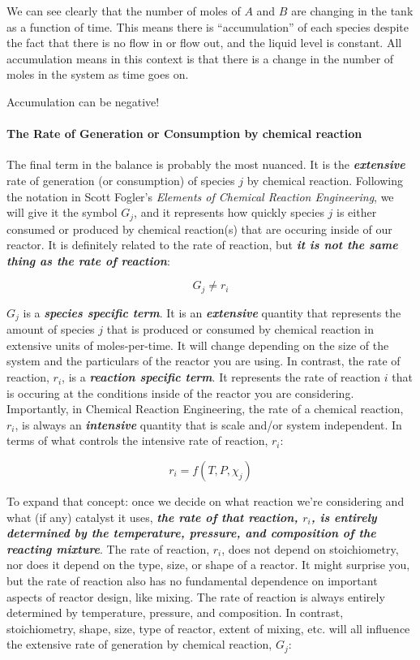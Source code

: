 \documentclass[11pt]{article}
\begin{document}
We can see clearly that the number of moles of \(A\) and \(B\) are
changing in the tank as a function of time. This means there is
``accumulation'' of each species despite the fact that there is no flow
in or flow out, and the liquid level is constant. All accumulation means
in this context is that there is a change in the number of moles in the
system as time goes on.

Accumulation can be negative!

\hypertarget{the-rate-of-generation-or-consumption-by-chemical-reaction}{%
\paragraph{The Rate of Generation or Consumption by chemical
reaction}\label{the-rate-of-generation-or-consumption-by-chemical-reaction}}

The final term in the balance is probably the most nuanced. It is the
\textbf{\emph{extensive}} rate of generation (or consumption) of species
\(j\) by chemical reaction. Following the notation in Scott Fogler's
\emph{Elements of Chemical Reaction Engineering}, we will give it the
symbol \(G_j\), and it represents how quickly species \(j\) is either
consumed or produced by chemical reaction(s) that are occuring inside of
our reactor. It is definitely related to the rate of reaction, but
\textbf{\emph{it is not the same thing as the rate of reaction}}:

\[G_j \neq r_i\]

\(G_j\) is a \textbf{\emph{species specific term}}. It is an
\textbf{\emph{extensive}} quantity that represents the amount of species
\(j\) that is produced or consumed by chemical reaction in extensive
units of moles-per-time. It will change depending on the size of the
system and the particulars of the reactor you are using. In contrast,
the rate of reaction, \(r_i\), is a \textbf{\emph{reaction specific
term}}. It represents the rate of reaction \(i\) that is occuring at the
conditions inside of the reactor you are considering. Importantly, in
Chemical Reaction Engineering, the rate of a chemical reaction, \(r_i\),
is always an \textbf{\emph{intensive}} quantity that is scale and/or
system independent. In terms of what controls the intensive rate of
reaction, \(r_i\):

\[r_i = f(T, P, \chi_j)\]

To expand that concept: once we decide on what reaction we're
considering and what (if any) catalyst it uses, \textbf{\emph{the rate
of that reaction, \(r_i\), is entirely determined by the temperature,
pressure, and composition of the reacting mixture}}. The rate of
reaction, \(r_i\), does not depend on stoichiometry, nor does it depend
on the type, size, or shape of a reactor. It might surprise you, but the
rate of reaction also has no fundamental dependence on important aspects
of reactor design, like mixing. The rate of reaction is always entirely
determined by temperature, pressure, and composition. In contrast,
stoichiometry, shape, size, type of reactor, extent of mixing, etc. will
all influence the extensive rate of generation by chemical reaction,
\(G_j\):
\end{document}
